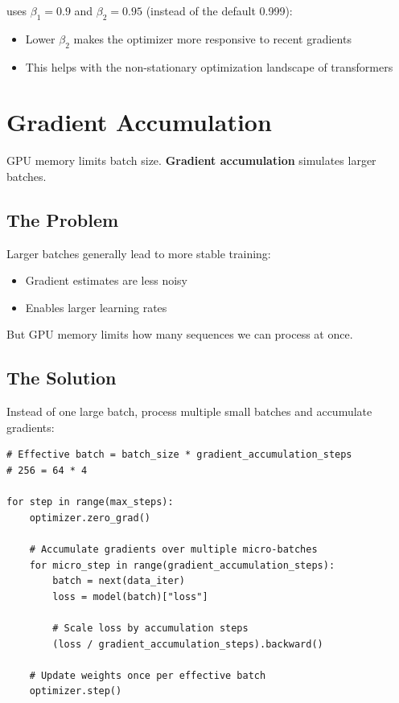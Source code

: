 \TryLM uses $\beta_1 = 0.9$ and $\beta_2 = 0.95$ (instead of the default 0.999):
\begin{itemize}
    \item Lower $\beta_2$ makes the optimizer more responsive to recent gradients
    \item This helps with the non-stationary optimization landscape of transformers
\end{itemize}

\section{Gradient Accumulation}

GPU memory limits batch size. \textbf{Gradient accumulation} simulates larger batches.

\subsection{The Problem}

Larger batches generally lead to more stable training:
\begin{itemize}
    \item Gradient estimates are less noisy
    \item Enables larger learning rates
\end{itemize}

But GPU memory limits how many sequences we can process at once.

\subsection{The Solution}

Instead of one large batch, process multiple small batches and accumulate gradients:

\begin{lstlisting}[style=python]
# Effective batch = batch_size * gradient_accumulation_steps
# 256 = 64 * 4

for step in range(max_steps):
    optimizer.zero_grad()

    # Accumulate gradients over multiple micro-batches
    for micro_step in range(gradient_accumulation_steps):
        batch = next(data_iter)
        loss = model(batch)["loss"]

        # Scale loss by accumulation steps
        (loss / gradient_accumulation_steps).backward()

    # Update weights once per effective batch
    optimizer.step()
\end{lstlisting}

